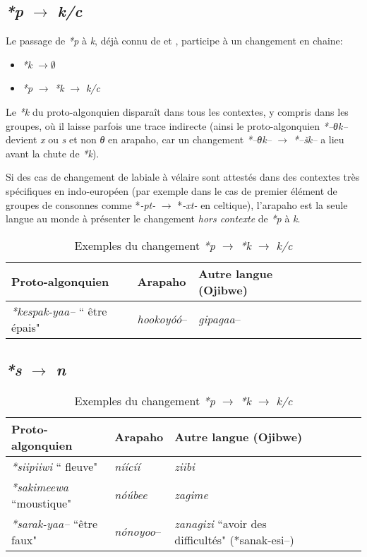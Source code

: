 \documentclass[twoside,a4paper,11pt]{article}
\newcommand{\ipa}[1]{{\phon\textit{#1}}}
\newcommand{\Σ}{\greek{Σ}}
\begin{document}
\subsection{\ipa{*p} $\rightarrow$ \ipa{k/c} }
Le passage de \ipa{*p} à \ipa{k}, déjà connu de \citet{kroeber16arapaho} et \citet{michelson35shifts}, participe à un changement en chaine:

\begin{itemize}
\item \ipa{*k} $\rightarrow \emptyset$
\item \ipa{*p} $\rightarrow$ \ipa{*k} $\rightarrow$  \ipa{k/c}
\end{itemize}

Le  \ipa{*k} du proto-algonquien disparaît dans tous les contextes, y compris dans les groupes, où il laisse parfois une trace indirecte (ainsi le proto-algonquien \ipa{*--θk--} devient \ipa{x} ou \ipa{s} et non \ipa{θ} en arapaho, car un changement \ipa{*--θk--} $\rightarrow $  \ipa{*--šk--} a lieu avant la chute de \ipa{*k}).

Si des cas de changement de labiale à vélaire sont attestés dans des contextes très spécifiques en indo-européen (par exemple dans le cas de premier élément de groupes de consonnes comme *\ipa{-pt-} $\rightarrow$ *\ipa{-xt-} en celtique), l'arapaho est la seule langue au monde à présenter le changement \textit{hors contexte} de  \ipa{*p} à \ipa{k}. 

 \begin{table}[H]
\caption{Exemples du changement \ipa{*p} $\rightarrow$ \ipa{*k} $\rightarrow$  \ipa{k/c}} \centering  \label{tab:p.k}
\begin{tabular}{lllllll}
\toprule
Proto-algonquien & Arapaho & Autre langue (Ojibwe)\\
\midrule
 \ipa{*kespak-yaa--} `` être épais" & \textit{hookoyóó}--    &  \textit{gipagaa}-- \\

\bottomrule
\end{tabular}
\end{table}
 

\subsection{\ipa{*s} $\rightarrow$ \ipa{n} }

 \begin{table}[H]
\caption{Exemples du changement \ipa{*p} $\rightarrow$ \ipa{*k} $\rightarrow$  \ipa{k/c}} \centering  \label{tab:p.k}
\begin{tabular}{lllllll}
\toprule
Proto-algonquien & Arapaho & Autre langue (Ojibwe)\\
\midrule
 \ipa{*siipiiwi} `` fleuve" &  \ipa{níícíí}       &  \ipa{ziibi} \\
\ipa{*sakimeewa} ``moustique" & \ipa{nóúbee}  &  \ipa{zagime} \\
\ipa{*sarak-yaa--} ``être faux" & \textit{nónoyoo}--  & \textit{zanagizi} ``avoir des difficultés" (*sanak-esi--) \\
\bottomrule
\end{tabular}
\end{table}
\end{document}

